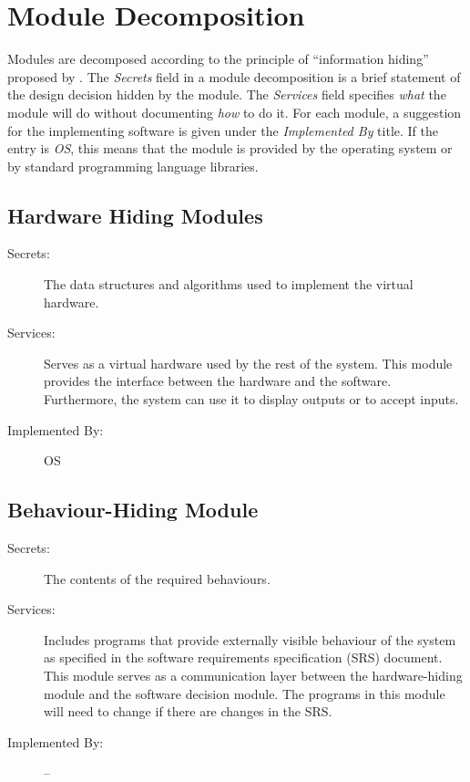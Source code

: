 \documentclass[12pt, titlepage]{article}
\begin{document}
\section{Module Decomposition} \label{SecMD}

Modules are decomposed according to the principle of ``information hiding''
proposed by \citet{ParnasEtAl1984}. The \emph{Secrets} field in a module
decomposition is a brief statement of the design decision hidden by the
module. The \emph{Services} field specifies \emph{what} the module will do
without documenting \emph{how} to do it. For each module, a suggestion for the
implementing software is given under the \emph{Implemented By} title. If the
entry is \emph{OS}, this means that the module is provided by the operating
system or by standard programming language libraries.

\subsection{Hardware Hiding Modules}

\begin{description}
\item[Secrets:]The data structures and algorithms used to implement the virtual
  hardware.
\item[Services:]Serves as a virtual hardware used by the rest of the
  system. This module provides the interface between the hardware and the
  software. Furthermore, the system can use it to display outputs or to accept inputs.
\item[Implemented By:] OS
\end{description}

\subsection{Behaviour-Hiding Module}

\begin{description}
\item[Secrets:]The contents of the required behaviours.
\item[Services:]Includes programs that provide externally visible behaviour of
  the system as specified in the software requirements specification (SRS)
  document. This module serves as a communication layer between the
  hardware-hiding module and the software decision module. The programs in this
  module will need to change if there are changes in the SRS.
\item[Implemented By:] --
\end{description}
\end{document}

